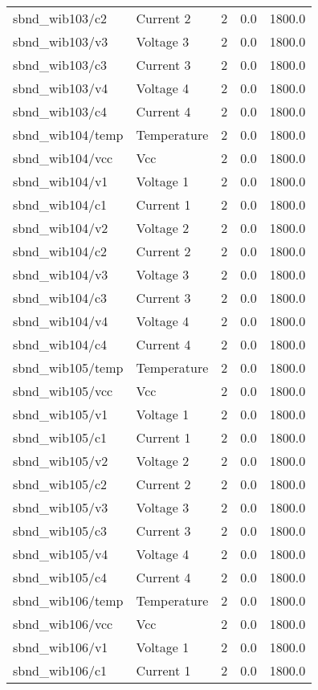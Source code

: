 \begin{center}
\begin{longtable}{l | l l l l }
sbnd\_wib103/c2 & Current 2 & 2 & 0.0 & 1800.0\\ 
sbnd\_wib103/v3 & Voltage 3 & 2 & 0.0 & 1800.0\\ 
sbnd\_wib103/c3 & Current 3 & 2 & 0.0 & 1800.0\\ 
sbnd\_wib103/v4 & Voltage 4 & 2 & 0.0 & 1800.0\\ 
sbnd\_wib103/c4 & Current 4 & 2 & 0.0 & 1800.0\\ 
sbnd\_wib104/temp & Temperature & 2 & 0.0 & 1800.0\\ 
sbnd\_wib104/vcc & Vcc & 2 & 0.0 & 1800.0\\ 
sbnd\_wib104/v1 & Voltage 1 & 2 & 0.0 & 1800.0\\ 
sbnd\_wib104/c1 & Current 1 & 2 & 0.0 & 1800.0\\ 
sbnd\_wib104/v2 & Voltage 2 & 2 & 0.0 & 1800.0\\ 
sbnd\_wib104/c2 & Current 2 & 2 & 0.0 & 1800.0\\ 
sbnd\_wib104/v3 & Voltage 3 & 2 & 0.0 & 1800.0\\ 
sbnd\_wib104/c3 & Current 3 & 2 & 0.0 & 1800.0\\ 
sbnd\_wib104/v4 & Voltage 4 & 2 & 0.0 & 1800.0\\ 
sbnd\_wib104/c4 & Current 4 & 2 & 0.0 & 1800.0\\ 
sbnd\_wib105/temp & Temperature & 2 & 0.0 & 1800.0\\ 
sbnd\_wib105/vcc & Vcc & 2 & 0.0 & 1800.0\\ 
sbnd\_wib105/v1 & Voltage 1 & 2 & 0.0 & 1800.0\\ 
sbnd\_wib105/c1 & Current 1 & 2 & 0.0 & 1800.0\\ 
sbnd\_wib105/v2 & Voltage 2 & 2 & 0.0 & 1800.0\\ 
sbnd\_wib105/c2 & Current 2 & 2 & 0.0 & 1800.0\\ 
sbnd\_wib105/v3 & Voltage 3 & 2 & 0.0 & 1800.0\\ 
sbnd\_wib105/c3 & Current 3 & 2 & 0.0 & 1800.0\\ 
sbnd\_wib105/v4 & Voltage 4 & 2 & 0.0 & 1800.0\\ 
sbnd\_wib105/c4 & Current 4 & 2 & 0.0 & 1800.0\\ 
sbnd\_wib106/temp & Temperature & 2 & 0.0 & 1800.0\\ 
sbnd\_wib106/vcc & Vcc & 2 & 0.0 & 1800.0\\ 
sbnd\_wib106/v1 & Voltage 1 & 2 & 0.0 & 1800.0\\ 
sbnd\_wib106/c1 & Current 1 & 2 & 0.0 & 1800.0\\ 

\end{longtable}
\end{center}
